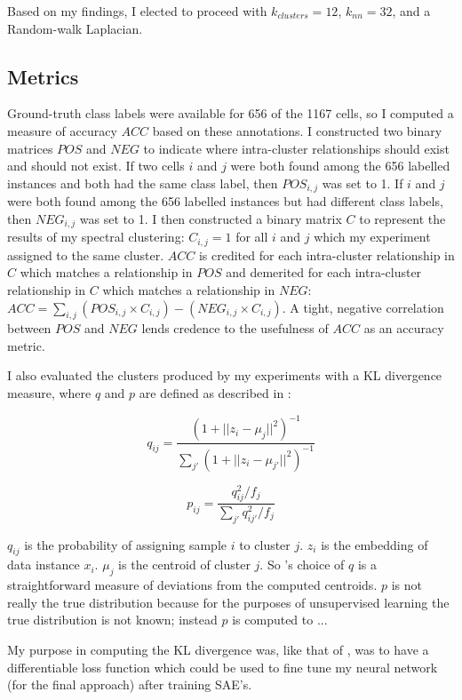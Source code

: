 \documentclass{article}
\newcommand{\nData}{1167}
\begin{document}
Based on my findings, I elected to proceed with $k_{clusters} = 12$, $k_{nn} = 32$, and a Random-walk Laplacian.

\subsection{Metrics}

Ground-truth class labels were available for 656 of the \nData{} cells, so I computed a measure of accuracy $ACC$ based on these annotations. I constructed two binary matrices $POS$ and $NEG$ to indicate where intra-cluster relationships should exist and should not exist. If two cells $i$ and $j$ were both found among the 656 labelled instances and both had the same class label, then $POS_{i,j}$ was set to 1. If $i$ and $j$ were both found among the 656 labelled instances but had different class labels, then $NEG_{i,j}$ was set to 1. I then constructed a binary matrix $C$ to represent the results of my spectral clustering: $C_{i,j} = 1$ for all $i$ and $j$ which my experiment assigned to the same cluster. $ACC$ is credited for each intra-cluster relationship in $C$ which matches a relationship in $POS$ and demerited for each intra-cluster relationship in $C$ which matches a relationship in $NEG$: $ACC = \sum_{i,j} (POS_{i,j}\times C_{i,j}) - (NEG_{i,j}\times C_{i,j})$. A tight, negative correlation between $POS$ and $NEG$ lends credence to the usefulness of $ACC$ as an accuracy metric. 

I also evaluated the clusters produced by my experiments with a KL divergence measure, where $q$ and $p$ are defined as described in \cite{xie2016unsupervised}:

$$
q_{ij} = \frac
{(1 + ||z_i - \mu_j||^2)^{-1}}
{\sum_{j'}(1 + ||z_i - \mu_{j'}||^2)^{-1}}
$$

$$
p_{ij} = \frac
{q^2_{ij}/f_j}
{\sum_{j'} q^2_{ij'}/f_j}
$$

$q_{ij}$ is the probability of assigning sample $i$ to cluster $j$. $z_i$ is the embedding of data instance $x_i$. $\mu_j$ is the centroid of cluster $j$. So \cite{xie2016unsupervised}'s choice of $q$ is a straightforward measure of deviations from the computed centroids. $p$ is not really the true distribution because for the purposes of unsupervised learning the true distribution is not known; instead $p$ is computed to ...

My purpose in computing the KL divergence was, like that of \cite{xie2016unsupervised}, was to have a differentiable loss function which could be used to fine tune my neural network (for the final approach) after training SAE's. 
\end{document}
